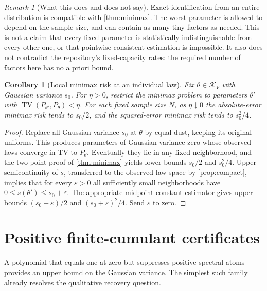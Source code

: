 \documentclass[11pt,letterpaper]{article}
\numberwithin{equation}{section}
\newtheorem{corollary}[theorem]{Corollary}
\theoremstyle{definition}
\theoremstyle{remark}
\newtheorem{remark}[theorem]{Remark}
\newcommand{\TV}{\operatorname{TV}}
\newcommand{\K}{\mathcal K_V}
\begin{document}
\begin{remark}[What this does and does not say]
Exact identification from an entire distribution is compatible with
\cref{thm:minimax}. The worst parameter is allowed to depend on the sample
size, and can contain as many tiny factors as needed. This is not a claim
that every fixed parameter is statistically indistinguishable from every
other one, or that pointwise consistent estimation is impossible. It also
does not contradict the repository's fixed-capacity rates: the required
number of factors here has no a priori bound.
\end{remark}

\begin{corollary}[Local minimax risk at an individual law]
\label{cor:localminimax}
Fix $\theta\in\K$ with Gaussian variance $s_0$. For $\eta>0$, restrict the
minimax problem to parameters $\theta'$ with
$\TV(P_{\theta'},P_\theta)<\eta$. For each fixed sample size $N$, as
$\eta\downarrow0$ the absolute-error minimax risk tends to $s_0/2$, and
the squared-error minimax risk tends to $s_0^2/4$.
\end{corollary}
\begin{proof}
Replace all Gaussian variance $s_0$ at $\theta$ by equal dust, keeping its
original uniforms. This produces parameters of Gaussian variance zero whose
observed laws converge in TV to $P_\theta$. Eventually they lie in any fixed
neighborhood, and the two-point proof of \cref{thm:minimax} yields lower
bounds $s_0/2$ and $s_0^2/4$. Upper semicontinuity of $s$, transferred to the
observed-law space by \cref{prop:compact}, implies that for every
$\varepsilon>0$ all sufficiently small neighborhoods have
$0\le s(\theta')\le s_0+\varepsilon$. The appropriate midpoint constant
estimator gives upper bounds $(s_0+\varepsilon)/2$ and
$(s_0+\varepsilon)^2/4$. Send $\varepsilon$ to zero.
\end{proof}

\section{Positive finite-cumulant certificates}
\label{sec:ladder}

A polynomial that equals one at zero but suppresses positive spectral atoms
provides an upper bound on the Gaussian variance. The simplest such family
already resolves the qualitative recovery question.
\end{document}
